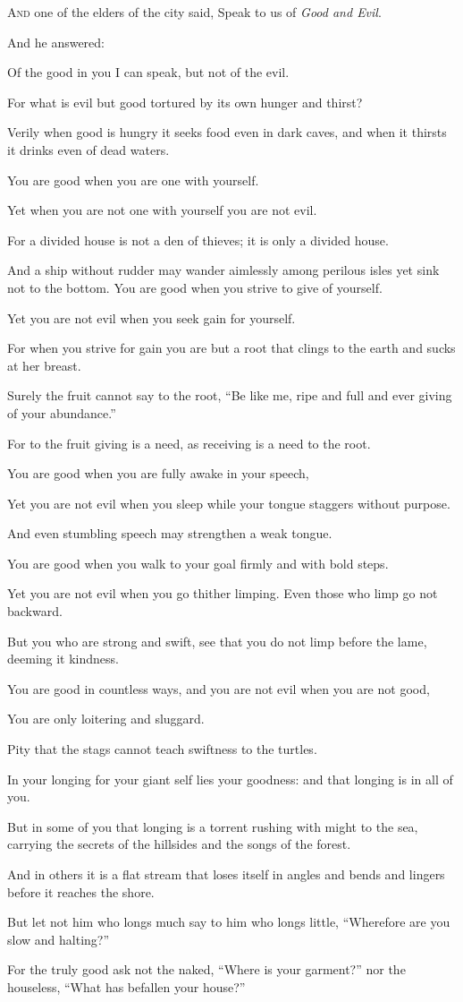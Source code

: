 \lettrine{A}{nd} one of the elders of the city
said, Speak to us of \textit{Good and Evil}.

\bigskip
And he answered:

Of the good in you I can speak, but not
of the evil.

For what is evil but good tortured by
its own hunger and thirst?

Verily when good is hungry it seeks food
even in dark caves, and when it thirsts
it drinks even of dead waters.

You are good when you are one with
yourself.

Yet when you are not one with yourself
you are not evil.

For a divided house is not a den of
thieves; it is only a divided house.

And a ship without rudder may wander
aimlessly among perilous isles yet sink
not to the bottom. You are good when
you strive to give of yourself.

Yet you are not evil when you seek gain
for yourself.

For when you strive for gain you are
but a root that clings to the earth and
sucks at her breast.

Surely the fruit cannot say to the root,
\enquote{Be like me, ripe and full and ever
giving of your abundance.}

For to the fruit giving is a need, as
receiving is a need to the root.



You are good when you are fully awake in
your speech,

Yet you are not evil when you sleep
while your tongue staggers without
purpose.

And even stumbling speech may strengthen
a weak tongue.

You are good when you walk to your goal
firmly and with bold steps.

Yet you are not evil when you go thither
limping. Even those who limp go not
backward.

But you who are strong and swift, see
that you do not limp before the lame,
deeming it kindness.



You are good in countless ways, and you
are not evil when you are not good,

You are only loitering and sluggard.

Pity that the stags cannot teach
swiftness to the turtles.

In your longing for your giant self lies
your goodness: and that longing is in
all of you.

But in some of you that longing is a
torrent rushing with might to the sea,
carrying the secrets of the hillsides
and the songs of the forest.

And in others it is a flat stream that
loses itself in angles and bends and
lingers before it reaches the shore.

But let not him who longs much say to
him who longs little, \enquote{Wherefore are
you slow and halting?}

For the truly good ask not the naked,
\enquote{Where is your garment?} nor the
houseless, \enquote{What has befallen your
house?}
